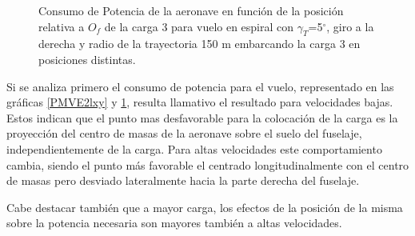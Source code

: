 \begin{figure}
	\centering
	\caption{Consumo de Potencia de la aeronave en función de la posición relativa a $O_f$ de la carga 3 para vuelo en espiral con $\gamma_T$=5$^\circ$, giro a la derecha y radio de la trayectoria 150 m embarcando la carga 3 en posiciones distintas.}
	\label{PMVE3lxy}
\end{figure}

Si se analiza primero el consumo de potencia para el vuelo, representado en las gráficas \ref{PMVE2lxy} y \ref{PMVE3lxy}, resulta llamativo el resultado para velocidades bajas. Estos indican que el punto mas desfavorable para la colocación de la carga es la proyección del centro de masas de la aeronave sobre el suelo del fuselaje, independientemente de la carga. 
Para altas velocidades este comportamiento cambia, siendo el punto más favorable el centrado longitudinalmente con el centro de masas pero desviado lateralmente hacia la parte derecha del fuselaje.

Cabe destacar también que a mayor carga, los efectos de la posición de la misma sobre la potencia necesaria son mayores también a altas velocidades.

